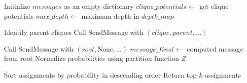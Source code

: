\documentclass[a4paper,12pt]{article}
\begin{document}
\begin{algorithm}
\begin{algorithmic}[1]
    \State Initialize $messages$ as an empty dictionary
    \State $clique\_potentials \gets$ get clique potentials
    \State $max\_depth \gets$ maximum depth in $depth\_map$
    
    \State Identify parent cliques
    \State Call SendMessage with $(clique, parent, ...)$
    \EndFor
    \EndFor
    \EndFor
    
    \State Call SendMessage with $(root, \text{None}, ...)$
    \State $message\_final \gets$ computed message from root
    \State Normalize probabilities using partition function $Z$
    
    \State Sort assignments by probability in descending order
    \State Return top-$k$ assignments
    
    \end{algorithmic}
    \end{algorithm}
\end{document}

